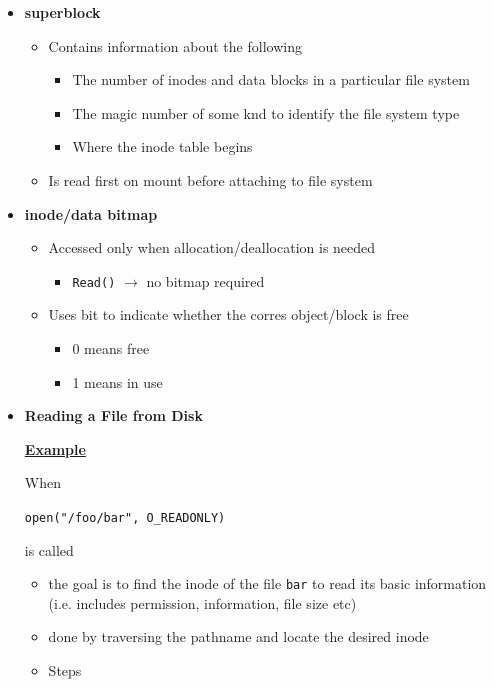 \documentclass[12pt]{article}
\begin{document}
\begin{enumerate}[1.]
\begin{itemize}
\begin{itemize}
        \end{itemize}
        \item \textbf{superblock}
        \begin{itemize}
            \item Contains information about the following
            \begin{itemize}
                \item The number of inodes and data blocks in a particular file system
                \item The magic number of some knd to identify the file system type
                \item Where the inode table begins
            \end{itemize}
            \item Is read first on mount before attaching to file system
        \end{itemize}
        \item \textbf{inode/data bitmap}
        \begin{itemize}
            \item Accessed only when allocation/deallocation is needed
            \begin{itemize}
                \item \texttt{Read()} $\to$ no bitmap required
            \end{itemize}
            \item Uses bit to indicate whether the corres object/block is free
            \begin{itemize}
                \item 0 means free
                \item 1 means in use
            \end{itemize}
        \end{itemize}

        \item \textbf{Reading a File from Disk}

        \underline{\textbf{Example}}

        \bigskip

        When

        \bigskip

        \texttt{open("/foo/bar", O\_READONLY)}

        \bigskip

        is called

        \bigskip

        \begin{itemize}
            \item the goal is to find the inode of the file \texttt{bar} to read its basic information
            (i.e. includes permission, information, file size etc)
            \item done by traversing the pathname and locate the desired inode
            \item Steps


\end{itemize}
\end{itemize}
\end{enumerate}
\end{document}
